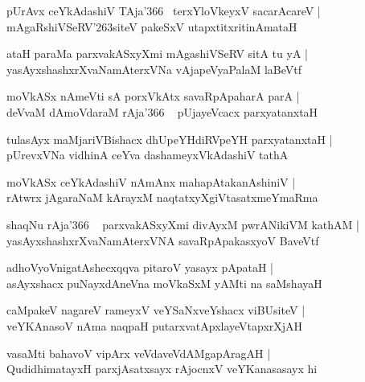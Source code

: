 \documentclass[twoside,12pt,openright]{book}
\def\S{\char'263}
\newcounter{shloka}[chapter]
\begin{document}
\begin{shloka}%
pUrAvx ceYkAdashiV TAja\char'366 ~terxYloVkeyxV sacarAcareV |\\
mAgaRshiVSeRV\S siteV pakeSxV utapxtitxritinAmataH
\end{shloka}

\begin{shloka}%
ataH paraMa parxvakASxyXmi mAgashiVSeRV sitA tu yA |\\
yasAyxshashxrXvaNamAterxVNa vAjapeVyaPalaM laBeVtf
\end{shloka}

\begin{shloka}%
moVkASx nAmeVti sA porxVkAtx savaRpApaharA parA |\\
deVvaM dAmoVdaraM rAja\char'366 ~ pUjayeVcacx parxyatanxtaH
\end{shloka}

\begin{shloka}%
tulasAyx maMjariVBishacx dhUpeYHdiRVpeYH parxyatanxtaH |\\
pUrevxVNa vidhinA ceYva dashameyxVkAdashiV tathA 
\end{shloka}

\begin{shloka}%
moVkASx ceYkAdashiV nAmAnx mahapAtakanAshiniV |\\
rAtwrx jAgaraNaM kArayxM naqtatxyXgiVtasatxmeYmaRma
\end{shloka}

\begin{shloka}%
shaqNu rAja\char'366 ~ parxvakASxyXmi divAyxM pwrANikiVM kathAM |\\
yasAyxshashxrXvaNamAterxVNA savaRpApakasxyoV BaveVtf
\end{shloka}

\begin{shloka}%
adhoVyoVnigatAshecxqqva pitaroV yasayx pApataH |\\
asAyxshacx puNayxdAneVna moVkaSxM yAMti na saMshayaH
\end{shloka}

\begin{shloka}%
caMpakeV nagareV rameyxV veYSaNxveYshacx viBUsiteV |\\
veYKAnasoV nAma naqpaH putarxvatApxlayeVtapxrXjAH 
\end{shloka}

\begin{shloka}%
vasaMti bahavoV vipArx veVdaveVdAMgapAragAH |\\
QudidhimatayxH parxjAsatxsayx rAjocnxV veYKanasasayx hi
\end{shloka}
\end{document}
